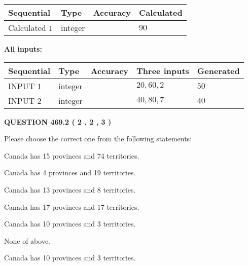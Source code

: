 \documentclass[12pt]{article}
\begin{document}
   
  
  
\noindent\begin{tabular}{|l|l|l|l|}
\hline
 Sequential & Type & Accuracy & Calculated \\ 
\hline
 
 
  Calculated $  1 $ & integer &  & 
  $ 90 $ 
 \\  \hline  
 \end{tabular}
   
   
   
   
\noindent\vspace{0.1in}\hspace{-0.08in} {\textbf{\Large{All inputs: }}}
   
   
  
  
\noindent\begin{tabular}{|l|l|l|l|l|}
\hline
 Sequential & Type & Accuracy & Three inputs & Generated \\ 
\hline
 
 
  INPUT $  1 $ & integer &  & $
 20
 , 
 60
 , 
 2
 $ & $ 50 $ 
 \\  \hline  
 
 
  INPUT $  2 $ & integer &  & $
 40
 , 
 80
 , 
 7
 $ & $ 40 $ 
 \\  \hline  
 \end{tabular}
   
   
  
\vspace{0.2in}
  
{\textbf{\Large{QUESTION
469.2 
 ( 2 , 2 , 3 )
}}}
  
  
Please choose the correct one from the following statements:
 
 
Canada has  15 provinces and  74 territories.
 
 
Canada has   4 provinces and  19 territories.
 
 
Canada has  13 provinces and  8 territories.
 
 
Canada has  17 provinces and  17 territories.
 
 
Canada has 10  provinces and 3 territories.
 
 
 None of above.
 
 
\noindent{}
 
 
Canada has 10  provinces and 3 territories.
 
\end{document}
